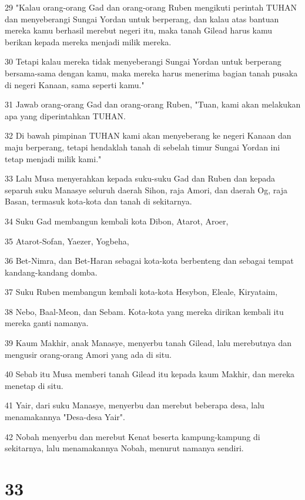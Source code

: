 \par 29 "Kalau orang-orang Gad dan orang-orang Ruben mengikuti perintah TUHAN dan menyeberangi Sungai Yordan untuk berperang, dan kalau atas bantuan mereka kamu berhasil merebut negeri itu, maka tanah Gilead harus kamu berikan kepada mereka menjadi milik mereka.
\par 30 Tetapi kalau mereka tidak menyeberangi Sungai Yordan untuk berperang bersama-sama dengan kamu, maka mereka harus menerima bagian tanah pusaka di negeri Kanaan, sama seperti kamu."
\par 31 Jawab orang-orang Gad dan orang-orang Ruben, "Tuan, kami akan melakukan apa yang diperintahkan TUHAN.
\par 32 Di bawah pimpinan TUHAN kami akan menyeberang ke negeri Kanaan dan maju berperang, tetapi hendaklah tanah di sebelah timur Sungai Yordan ini tetap menjadi milik kami."
\par 33 Lalu Musa menyerahkan kepada suku-suku Gad dan Ruben dan kepada separuh suku Manasye seluruh daerah Sihon, raja Amori, dan daerah Og, raja Basan, termasuk kota-kota dan tanah di sekitarnya.
\par 34 Suku Gad membangun kembali kota Dibon, Atarot, Aroer,
\par 35 Atarot-Sofan, Yaezer, Yogbeha,
\par 36 Bet-Nimra, dan Bet-Haran sebagai kota-kota berbenteng dan sebagai tempat kandang-kandang domba.
\par 37 Suku Ruben membangun kembali kota-kota Hesybon, Eleale, Kiryataim,
\par 38 Nebo, Baal-Meon, dan Sebam. Kota-kota yang mereka dirikan kembali itu mereka ganti namanya.
\par 39 Kaum Makhir, anak Manasye, menyerbu tanah Gilead, lalu merebutnya dan mengusir orang-orang Amori yang ada di situ.
\par 40 Sebab itu Musa memberi tanah Gilead itu kepada kaum Makhir, dan mereka menetap di situ.
\par 41 Yair, dari suku Manasye, menyerbu dan merebut beberapa desa, lalu menamakannya "Desa-desa Yair".
\par 42 Nobah menyerbu dan merebut Kenat beserta kampung-kampung di sekitarnya, lalu menamakannya Nobah, menurut namanya sendiri.

\chapter{33}

